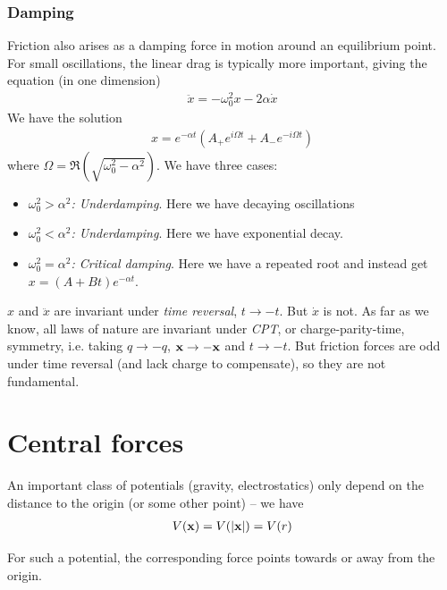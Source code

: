 \documentclass{../template/note}
\begin{document}
    \subsubsection{Damping}

    Friction also arises as a damping force in motion around an equilibrium point. For small oscillations, the linear drag is typically more important, giving the equation (in one dimension)
    \begin{align*}
        \ddot x = -\omega_0^2 x - 2\alpha \dot x
    \end{align*}
    We have the solution
    \begin{align*}
        x = e^{-\alpha t}\left(A_+ e^{i\Omega t} + A_- e^{-i\Omega t}\right)
    \end{align*}
    where \(\Omega = \Re\left(\sqrt{\omega_0^2-\alpha^2}\right)\). We have three cases:
    \begin{itemize}
        \item \emph{\(\omega_0^2 > \alpha^2\): Underdamping}. Here we have decaying oscillations
        \item \emph{\(\omega_0^2 < \alpha^2\): Underdamping}. Here we have exponential decay.
        \item \emph{\(\omega_0^2 = \alpha^2\): Critical damping}. Here we have a repeated root and instead get \(x = (A + Bt)e^{-\alpha t}\).
    \end{itemize}
    
    \begin{remark*}
        \(x\) and \(\ddot x\) are invariant under \emph{time reversal}, \(t \to -t\). But \(\dot x\) is not. As far as we know, all laws of nature are invariant under \emph{CPT}, or charge-parity-time, symmetry, i.e. taking \(q \to -q\), \(\V x \to -\V x\) and \(t \to -t\). But friction forces are odd under time reversal (and lack charge to compensate), so they are not fundamental.
    \end{remark*}
    
    \section{Central forces}

    An important class of potentials (gravity, electrostatics) only depend on the distance to the origin (or some other point) -- we have
    \begin{align*}
        V(\V x) = V(|\V x|) = V(r)
    \end{align*}
    \begin{proposition}
        For such a potential, the corresponding force points towards or away from the origin.
        \label{central-forces}
    \end{proposition}
    
\end{document}
